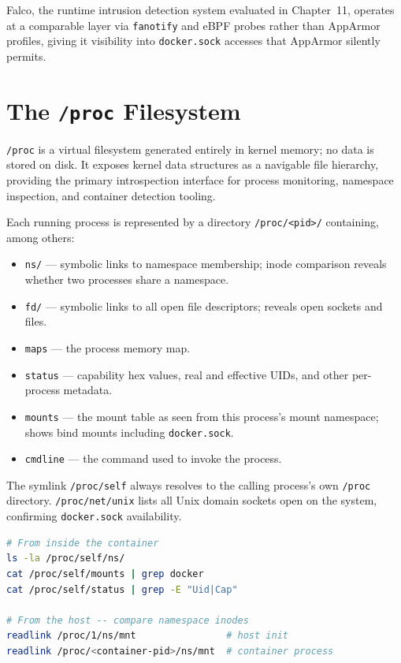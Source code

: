 Falco, the runtime intrusion detection system evaluated in Chapter~11, operates at a
comparable layer via \texttt{fanotify} and eBPF probes rather than AppArmor profiles,
giving it visibility into \texttt{docker.sock} accesses that AppArmor silently permits.


\section{The \texttt{/proc} Filesystem}

\texttt{/proc} is a virtual filesystem generated entirely in kernel memory; no data
is stored on disk. It exposes kernel data structures as a navigable file hierarchy,
providing the primary introspection interface for process monitoring, namespace
inspection, and container detection tooling.

Each running process is represented by a directory \texttt{/proc/\textless{}pid\textgreater{}/}
containing, among others:

\begin{itemize}
    \item \texttt{ns/} --- symbolic links to namespace membership; inode comparison
          reveals whether two processes share a namespace.
    \item \texttt{fd/} --- symbolic links to all open file descriptors; reveals open
          sockets and files.
    \item \texttt{maps} --- the process memory map.
    \item \texttt{status} --- capability hex values, real and effective UIDs, and
          other per-process metadata.
    \item \texttt{mounts} --- the mount table as seen from this process's mount
          namespace; shows bind mounts including \texttt{docker.sock}.
    \item \texttt{cmdline} --- the command used to invoke the process.
\end{itemize}

The symlink \texttt{/proc/self} always resolves to the calling process's own
\texttt{/proc} directory. \texttt{/proc/net/unix} lists all Unix domain sockets
open on the system, confirming \texttt{docker.sock} availability.

\begin{lstlisting}[language=bash]
# From inside the container
ls -la /proc/self/ns/
cat /proc/self/mounts | grep docker
cat /proc/self/status | grep -E "Uid|Cap"

# From the host -- compare namespace inodes
readlink /proc/1/ns/mnt                # host init
readlink /proc/<container-pid>/ns/mnt  # container process
\end{lstlisting}

